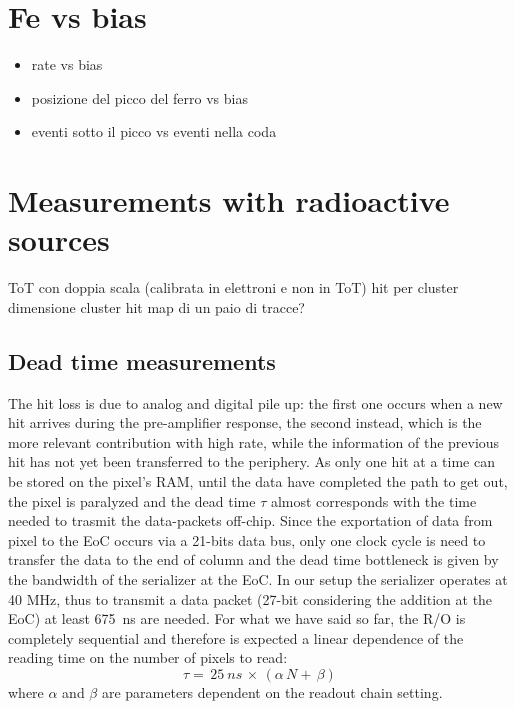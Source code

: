          \section{Fe vs bias}
         \begin{itemize}
             \item rate vs bias 
             \item posizione del picco del ferro vs bias    
             \item eventi sotto il picco vs eventi nella coda
         \end{itemize}
     
     
     \section{Measurements with radioactive sources}
         ToT con doppia scala (calibrata in elettroni e non in ToT)
         hit per cluster
         dimensione cluster
         hit map di un paio di tracce?
        \subsection{Dead time measurements}
        The hit loss is due to analog and digital pile up: the first one occurs when a new hit arrives during the pre-amplifier response, the second instead, which is the more relevant contribution with high rate, while the information of the previous hit has not yet been transferred to the periphery.  
        As only one hit at a time can be stored on the pixel's RAM, until the data have completed the path to get out, the pixel is paralyzed and the dead time $\tau$ almost corresponds with the time needed to trasmit the data-packets off-chip.
        Since the exportation of data from pixel to the EoC occurs via a 21-bits data bus, only one clock cycle is need to transfer the data to the end of column and the dead time bottleneck is given by the bandwidth of the serializer at the EoC. In our setup the serializer operates at 40 MHz, thus to transmit a data packet (27-bit considering the addition at the EoC) at least \SI{675}{ns} are needed. 
        For what we have said so far, the R/O is completely sequential and therefore is expected a linear dependence of the reading time on the number of pixels to read:
        \begin{equation}
            \tau =\, 25\: \unit{ns}\, \times\, (\alpha\, N +\, \beta)
            \label{eq:reading_time}
        \end{equation}
        where $\alpha$ and $\beta$ are parameters dependent on the readout chain setting. 
        
